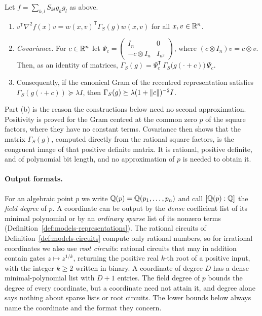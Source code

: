 \begin{lemma}
\label{lem:algebraic-gram}
Let $f=\sum_{k,l}S_{kl}g_kg_l$ as above.
\begin{enumerate}[label=(\alph*)]
\item $v^{\mathsf T}\nabla^2f(x)v=w(x,v)^{\mathsf T}\Gamma_S(g)w(x,v)$ for all
  $x,v\in\mathbb R^n$.
\item \emph{Covariance.} For $c\in\mathbb R^n$ let
  $\Psi_c=\begin{pmatrix}I_n&0\\-c\otimes I_n&I_{n^2}\end{pmatrix}$, where
  $(c\otimes I_n)v=c\otimes v$. Then, as an identity of matrices,
  $\Gamma_S(g)=\Psi_c^{\mathsf T}\,\Gamma_S\bigl(g(\cdot+c)\bigr)\,\Psi_c$.
\item Consequently, if the canonical Gram of the recentred representation
  satisfies $\Gamma_S(g(\cdot+c))\succeq\lambda I$, then
  $\Gamma_S(g)\succeq\lambda(1+\left\lVert c\right\rVert)^{-2}I$.
\end{enumerate}
\end{lemma}

Part (b) is the reason the constructions below need no second approximation.
Positivity is proved for the Gram centred at the common zero $p$ of the square
factors, where they have no constant terms. Covariance then shows that the matrix
$\Gamma_S(g)$, computed directly from the rational square factors, is the
congruent image of that positive definite matrix. It is rational, positive
definite, and of polynomial bit length, and no approximation of $p$ is needed
to obtain it.

\paragraph{Output formats.}
For an algebraic point $p$ we write $\mathbb Q(p)=\mathbb Q(p_1,\ldots,p_n)$ and call
$[\mathbb Q(p):\mathbb Q]$ the \emph{field degree} of $p$. A coordinate can be output by the
\emph{dense} coefficient list of its minimal polynomial or by an
\emph{ordinary sparse} list of its nonzero terms
(Definition~\ref{def:models-representations}). The rational circuits of
Definition~\ref{def:models-circuits} compute only rational numbers, so for
irrational coordinates we also use \emph{root circuits}: rational circuits
that may in addition contain gates $z\mapsto z^{1/k}$, returning the positive
real $k$-th root of a positive input, with the integer $k\ge2$ written in
binary. A coordinate of degree $D$ has a dense minimal-polynomial list with
$D+1$ entries. The field degree of $p$ bounds the degree of every coordinate,
but a coordinate need not attain it, and degree alone says nothing about
sparse lists or root circuits. The lower bounds below always name the
coordinate and the format they concern.

